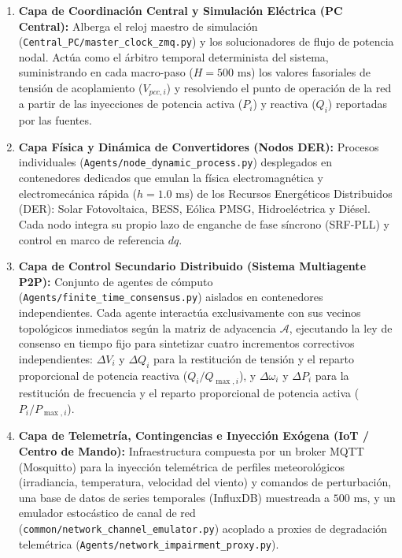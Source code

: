 \begin{enumerate}[1.]
    \item \textbf{Capa de Coordinación Central y Simulación Eléctrica (PC Central):} Alberga el reloj maestro de simulación (\texttt{Central\_PC/master\_clock\_zmq.py}) y los solucionadores de flujo de potencia nodal. Actúa como el árbitro temporal determinista del sistema, suministrando en cada macro-paso ($H = 500\text{ ms}$) los valores fasoriales de tensión de acoplamiento ($V_{pcc, i}$) y resolviendo el punto de operación de la red a partir de las inyecciones de potencia activa ($P_i$) y reactiva ($Q_i$) reportadas por las fuentes.
    
    \item \textbf{Capa Física y Dinámica de Convertidores (Nodos DER):} Procesos individuales (\texttt{Agents/node\_dynamic\_process.py}) desplegados en contenedores dedicados que emulan la física electromagnética y electromecánica rápida ($h = 1.0\text{ ms}$) de los Recursos Energéticos Distribuidos (DER): Solar Fotovoltaica, BESS, Eólica PMSG, Hidroeléctrica y Diésel. Cada nodo integra su propio lazo de enganche de fase síncrono (SRF-PLL) y control en marco de referencia $dq$.
    
    \item \textbf{Capa de Control Secundario Distribuido (Sistema Multiagente P2P):} Conjunto de agentes de cómputo (\texttt{Agents/finite\_time\_consensus.py}) aislados en contenedores independientes. Cada agente interactúa exclusivamente con sus vecinos topológicos inmediatos según la matriz de adyacencia $\mathcal{A}$, ejecutando la ley de consenso en tiempo fijo para sintetizar cuatro incrementos correctivos independientes: $\Delta V_i$ y $\Delta Q_i$ para la restitución de tensión y el reparto proporcional de potencia reactiva ($Q_i / Q_{\max, i}$), y $\Delta \omega_i$ y $\Delta P_i$ para la restitución de frecuencia y el reparto proporcional de potencia activa ($P_i / P_{\max, i}$).
    
    \item \textbf{Capa de Telemetría, Contingencias e Inyección Exógena (IoT / Centro de Mando):} Infraestructura compuesta por un broker MQTT (Mosquitto) para la inyección telemétrica de perfiles meteorológicos (irradiancia, temperatura, velocidad del viento) y comandos de perturbación, una base de datos de series temporales (InfluxDB) muestreada a $500\text{ ms}$, y un emulador estocástico de canal de red (\texttt{common/network\_channel\_emulator.py}) acoplado a proxies de degradación telemétrica (\texttt{Agents/network\_impairment\_proxy.py}).
\end{enumerate}

